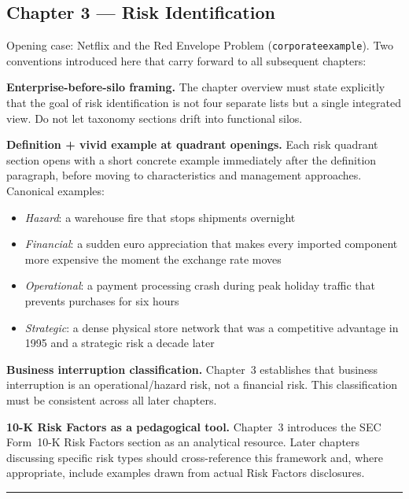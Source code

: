 \documentclass[11pt,openany]{book}
\newcommand{\code}[1]{\texttt{\small #1}}
\begin{document}
\subsection*{Chapter 3 --- Risk Identification}

Opening case: Netflix and the Red Envelope Problem (\code{corporateexample}). Two conventions introduced here that carry forward to all subsequent chapters:

\textbf{Enterprise-before-silo framing.} The chapter overview must state explicitly that the goal of risk identification is not four separate lists but a single integrated view. Do not let taxonomy sections drift into functional silos.

\textbf{Definition + vivid example at quadrant openings.} Each risk quadrant section opens with a short concrete example immediately after the definition paragraph, before moving to characteristics and management approaches. Canonical examples:
\begin{itemize}[leftmargin=1.5em]
  \item \emph{Hazard}: a warehouse fire that stops shipments overnight
  \item \emph{Financial}: a sudden euro appreciation that makes every imported component more expensive the moment the exchange rate moves
  \item \emph{Operational}: a payment processing crash during peak holiday traffic that prevents purchases for six hours
  \item \emph{Strategic}: a dense physical store network that was a competitive advantage in 1995 and a strategic risk a decade later
\end{itemize}

\textbf{Business interruption classification.} Chapter~3 establishes that business interruption is an operational/hazard risk, not a financial risk. This classification must be consistent across all later chapters.

\textbf{10-K Risk Factors as a pedagogical tool.} Chapter~3 introduces the SEC Form~10-K Risk Factors section as an analytical resource. Later chapters discussing specific risk types should cross-reference this framework and, where appropriate, include examples drawn from actual Risk Factors disclosures.

\begin{center}\rule{0.5\linewidth}{0.5pt}\end{center}
\end{document}
